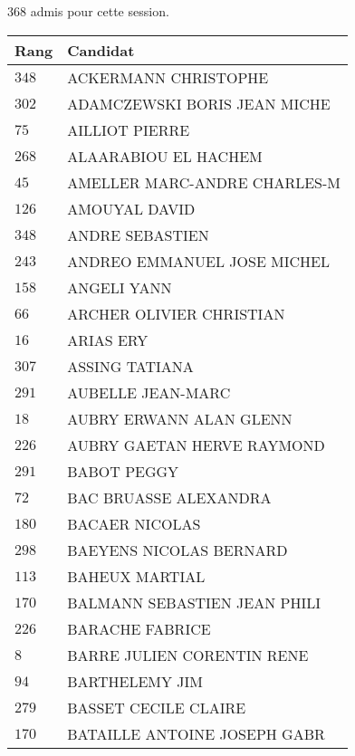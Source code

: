 



  $368$ admis pour cette session.

  \begin{xltabular}{\linewidth}{|l|X|}
    \hline
    \textbf{Rang} & \textbf{Candidat} \\
    \hline
    $348$ & ACKERMANN CHRISTOPHE \\
    \hline
    $302$ & ADAMCZEWSKI BORIS JEAN MICHE \\
    \hline
    $75$ & AILLIOT PIERRE \\
    \hline
    $268$ & ALAARABIOU EL HACHEM \\
    \hline
    $45$ & AMELLER MARC-ANDRE CHARLES-M \\
    \hline
    $126$ & AMOUYAL DAVID \\
    \hline
    $348$ & ANDRE SEBASTIEN \\
    \hline
    $243$ & ANDREO EMMANUEL JOSE MICHEL \\
    \hline
    $158$ & ANGELI YANN \\
    \hline
    $66$ & ARCHER OLIVIER CHRISTIAN \\
    \hline
    $16$ & ARIAS ERY \\
    \hline
    $307$ & ASSING TATIANA \\
    \hline
    $291$ & AUBELLE JEAN-MARC \\
    \hline
    $18$ & AUBRY ERWANN ALAN GLENN \\
    \hline
    $226$ & AUBRY GAETAN HERVE RAYMOND \\
    \hline
    $291$ & BABOT PEGGY \\
    \hline
    $72$ & BAC BRUASSE ALEXANDRA \\
    \hline
    $180$ & BACAER NICOLAS \\
    \hline
    $298$ & BAEYENS NICOLAS BERNARD \\
    \hline
    $113$ & BAHEUX MARTIAL \\
    \hline
    $170$ & BALMANN SEBASTIEN JEAN PHILI \\
    \hline
    $226$ & BARACHE FABRICE \\
    \hline
    $8$ & BARRE JULIEN CORENTIN RENE \\
    \hline
    $94$ & BARTHELEMY JIM \\
    \hline
    $279$ & BASSET CECILE CLAIRE \\
    \hline
    $170$ & BATAILLE ANTOINE JOSEPH GABR \\

\end{xltabular}
